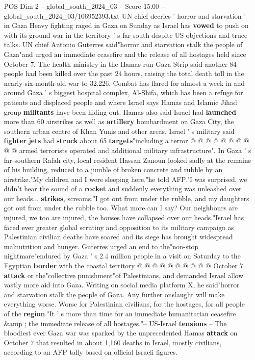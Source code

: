 \begin{textsample}{POS Dim 2 – global\_south\_2024\_03 – Score 15.00 – global\_south\_2024\_03/106952393.txt}  \label{ex:f2_pos_334}
UN chief decries ' horror and starvation ' in Gaza Heavy fighting raged in Gaza on Sunday as Israel has \textbf{vowed} to push on with its ground war in the territory ' s far south despite US objections and truce talks.
UN chief Antonio Guterres said"horror and starvation stalk the people of Gaza"and urged an immediate ceasefire and the release of all hostages held since October 7.
The health ministry in the Hamas-run Gaza Strip said another 84 people had been killed over the past 24 hours, raising the total death toll in the nearly six-month-old war to 32,226.
Combat has flared for almost a week in and around Gaza ' s biggest hospital complex, Al-Shifa, which has been a refuge for patients and displaced people and where Israel says Hamas and Islamic Jihad group \textbf{militants} have been hiding out.
Hamas also said Israel had \textbf{launched} more than 60 airstrikes as well as \textbf{artillery} bombardment on Gaza City, the southern urban centre of Khan Yunis and other areas.
Israel ' s military said \textbf{fighter} \textbf{jets} had \textbf{struck} about 65 \textbf{targets}"including a terror @ @ @ @ @ @ @ @ @ @ armed terrorists operated and additional military infrastructure".
In Gaza ' s far-southern Rafah city, local resident Hassan Zanoun looked sadly at the remains of his building, reduced to a jumble of broken concrete and rubble by an airstrike."My children and I were sleeping here,"he told AFP."I was surprised, we didn't hear the sound of a \textbf{rocket} and suddenly everything was unleashed over our heads... \textbf{strikes}, screams."I got out from under the rubble, and my daughters got out from under the rubble too.
What more can I say?
Our neighbours are injured, we too are injured, the houses have collapsed over our heads."Israel has faced ever greater global scrutiny and opposition to its military campaign as Palestinian civilian deaths have soared and its siege has brought widespread malnutrition and hunger.
Guterres urged an end to the"non-stop nightmare"endured by Gaza ' s 2.4 million people in a visit on Saturday to the Egyptian \textbf{border} with the coastal territory @ @ @ @ @ @ @ @ @ @ October 7 \textbf{attack} or the"collective punishment"of Palestinians, and demanded Israel allow vastly more aid into Gaza.
Writing on social media platform X, he said"horror and starvation stalk the people of Gaza.
Any further onslaught will make everything worse.
Worse for Palestinian civilians, for the hostages, for all people of the \textbf{region}."It ' s more than time for an immediate humanitarian ceasefire \&amp ; the immediate release of all hostages."-- US-Israel \textbf{tensions} -- The bloodiest ever Gaza war was sparked by the unprecedented Hamas \textbf{attack} on October 7 that resulted in about 1,160 deaths in Israel, mostly civilians, according to an AFP tally based on official Israeli figures.

\end{textsample}
